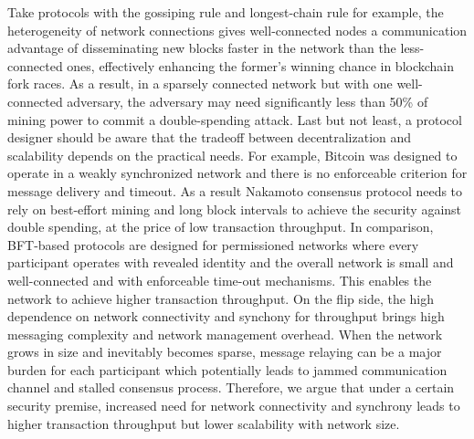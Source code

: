 Take protocols with the gossiping rule and longest-chain rule for example, the heterogeneity of network connections gives well-connected nodes a communication advantage of disseminating new blocks faster in the network than the less-connected ones, effectively enhancing the former's winning chance in blockchain fork races. 
As a result, in a sparsely connected network but with one well-connected adversary, the adversary may need significantly less than 50\% of mining power to commit a double-spending attack.
Last but not least, a protocol designer should be aware that the tradeoff between decentralization and scalability depends on the practical needs.
For example, Bitcoin was designed to operate in a weakly synchronized network and there is no enforceable criterion for message delivery and timeout. As a result Nakamoto consensus protocol needs to rely on best-effort mining and long block intervals to achieve the security against double spending, at the price of low transaction throughput. In comparison, BFT-based protocols are designed for permissioned networks where every participant operates with revealed identity and the overall network is small and well-connected and with enforceable time-out mechanisms. This enables the network to achieve higher transaction throughput. On the flip side, the high dependence on network connectivity and synchony for throughput brings high messaging complexity and network management overhead. When the network grows in size and inevitably becomes sparse, message relaying can be a major burden for each participant which potentially leads to jammed communication channel and stalled consensus process. Therefore, we argue that under a certain security premise, increased need for network connectivity and synchrony leads to higher transaction throughput but lower scalability with network size.

